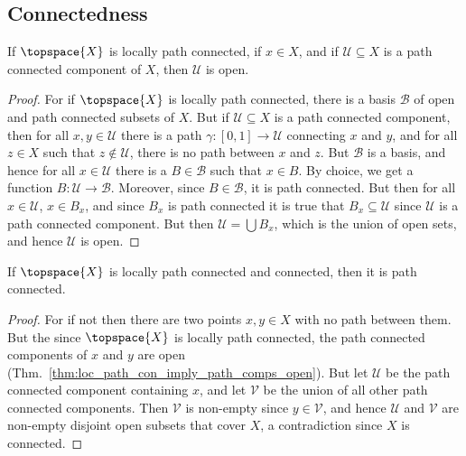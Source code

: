 \documentclass{article}                                                        %
\begin{document}
        \subsection{Connectedness}
            \begin{theorem}
                \label{thm:loc_path_con_imply_path_comps_open}%
                If $\topspace{X}$ is locally path connected, if $x\in{X}$, and if
                $\mathcal{U}\subseteq{X}$ is a path connected component of $X$,
                then $\mathcal{U}$ is open.
            \end{theorem}
            \begin{proof}
                For if $\topspace{X}$ is locally path connected, there is a basis
                $\mathcal{B}$ of open and path connected subsets of $X$. But if
                $\mathcal{U}\subseteq{X}$ is a path connected component, then for
                all $x,y\in\mathcal{U}$ there is a path
                $\gamma:[0,1]\rightarrow\mathcal{U}$ connecting $x$ and $y$, and for
                all $z\in{X}$ such that $z\notin\mathcal{U}$, there is no path
                between $x$ and $z$. But $\mathcal{B}$ is a basis, and hence for
                all $x\in\mathcal{U}$ there is a $B\in\mathcal{B}$ such that
                $x\in{B}$. By choice, we get a function
                $B:\mathcal{U}\rightarrow\mathcal{B}$. Moreover, since
                $B\in\mathcal{B}$, it is path connected. But then for all
                $x\in\mathcal{U}$, $x\in{B}_{x}$, and since $B_{x}$ is path
                connected it is true that $B_{x}\subseteq\mathcal{U}$ since
                $\mathcal{U}$ is a path connected component. But then
                $\mathcal{U}=\bigcup{B}_{x}$, which is the union of open sets, and
                hence $\mathcal{U}$ is open.
            \end{proof}
            \begin{theorem}
                \label{thm:Loc_Path_and_Con_Imply_Path_Con}
                If $\topspace{X}$ is locally path connected and connected, then it
                is path connected.
            \end{theorem}
            \begin{proof}
                For if not then there are two points $x,y\in{X}$ with no path
                between them. But the since $\topspace{X}$ is locally path
                connected, the path connected components of $x$ and $y$ are open
                (Thm.~\ref{thm:loc_path_con_imply_path_comps_open}). But let
                $\mathcal{U}$ be the path connected component containing $x$, and
                let $\mathcal{V}$ be the union of all other path connected
                components. Then $\mathcal{V}$ is non-empty since $y\in\mathcal{V}$,
                and hence $\mathcal{U}$ and $\mathcal{V}$ are non-empty disjoint
                open subsets that cover $X$, a contradiction since $X$ is connected.
            \end{proof}
\end{document}
